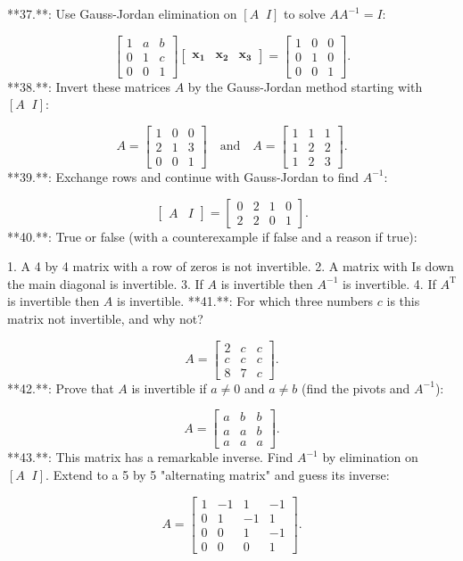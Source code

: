 

**37.**: Use Gauss-Jordan elimination on \([A\;\;I]\) to solve \(AA^{-1}=I\):

\[\begin{bmatrix}1&a&b\\ 0&1&c\\ 0&0&1\end{bmatrix}\left[\begin{array}{ccc}\bm{x_{1}}&\bm{x_{2}}&\bm{x_{3}} \end{array}\right]=\begin{bmatrix}1&0&0\\ 0&1&0\\ 0&0&1\end{bmatrix}.\]
**38.**: Invert these matrices \(A\) by the Gauss-Jordan method starting with \([A\;\;I]\):

\[A=\begin{bmatrix}1&0&0\\ 2&1&3\\ 0&0&1\end{bmatrix}\quad\text{and}\quad A=\begin{bmatrix}1&1&1\\ 1&2&2\\ 1&2&3\end{bmatrix}.\]
**39.**: Exchange rows and continue with Gauss-Jordan to find \(A^{-1}\):

\[\begin{bmatrix}A&I\end{bmatrix}=\begin{bmatrix}0&2&1&0\\ 2&2&0&1\end{bmatrix}.\]
**40.**: True or false (with a counterexample if false and a reason if true):

1. A 4 by 4 matrix with a row of zeros is not invertible.
2. A matrix with Is down the main diagonal is invertible.
3. If \(A\) is invertible then \(A^{-1}\) is invertible.
4. If \(A^{\mathrm{T}}\) is invertible then \(A\) is invertible.
**41.**: For which three numbers \(c\) is this matrix not invertible, and why not?

\[A=\begin{bmatrix}2&c&c\\ c&c&c\\ 8&7&c\end{bmatrix}.\]
**42.**: Prove that \(A\) is invertible if \(a\neq 0\) and \(a\neq b\) (find the pivots and \(A^{-1}\)):

\[A=\begin{bmatrix}a&b&b\\ a&a&b\\ a&a&a\end{bmatrix}.\]
**43.**: This matrix has a remarkable inverse. Find \(A^{-1}\) by elimination on \([A\;\;I]\). Extend to a 5 by 5 "alternating matrix" and guess its inverse:

\[A=\begin{bmatrix}1&-1&1&-1\\ 0&1&-1&1\\ 0&0&1&-1\\ 0&0&0&1\end{bmatrix}.\]